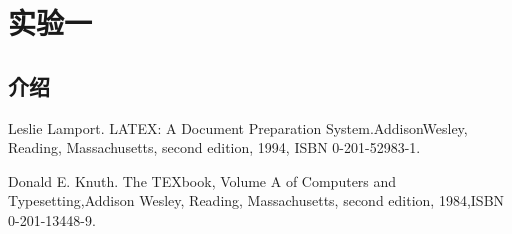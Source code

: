 \documentclass[a4paper,12pt]{report}
\begin{document}
\tableofcontents
\newpage

\chapter{实验一}

\section{介绍}


\begin{thebibliography}{99}
\songti {} 	
Leslie Lamport. LATEX: A Document Preparation System.AddisonWesley, Reading, Massachusetts, second edition, 1994, ISBN 0-201-52983-1.

Donald E. Knuth. The TEXbook, Volume A of Computers and Typesetting,Addison Wesley, Reading, Massachusetts, second edition, 1984,ISBN 0-201-13448-9.
\end{thebibliography}

\end{document}
